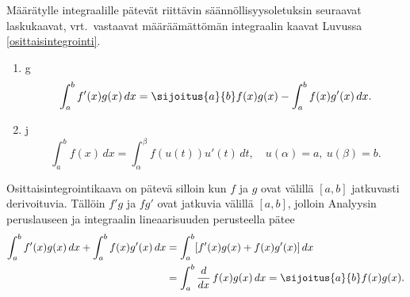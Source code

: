 Määrätylle integraalille pätevät riittävin säännöllisyysoletuksin seuraavat laskukaavat, 
vrt.\ vastaavat määräämättömän integraalin kaavat Luvussa \ref{osittaisintegrointi}. 
\begin{enumerate}
\item {}g
\[
\int_a^b f'(x)g(x)\, dx=\sijoitus{a}{b} f(x)g(x)-\int_a^b f(x)g'(x)\, dx.
\]
\item {}j
\[
\int_a^b f(x)\, dx = \int_\alpha^\beta f(u(t))u'(t)\, dt,\quad u(\alpha)=a, \ u(\beta)=b.
\]
\end{enumerate}
Osittaisintegrointikaava on pätevä silloin kun $f$ ja $g$ ovat välillä $[a,b]$ jatkuvasti 
derivoituvia. Tällöin $f'g$ ja $fg'$ ovat jatkuvia välillä $[a,b]$, jolloin Analyysin
peruslauseen ja integraalin lineaarisuuden perusteella pätee
\begin{align*}
\int_a^b f'(x)g(x)\,dx+\int_a^b f(x)g'(x)\,dx
            &= \int_a^b [f'(x)g(x)+f(x)g'(x)]\,dx \\     
            &= \int_a^b \frac{d}{dx}\,f(x)g(x)\,dx = \sijoitus{a}{b} f(x)g(x).
\end{align*}

